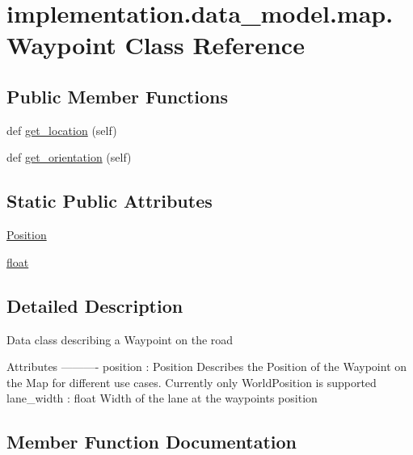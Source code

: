 \hypertarget{classimplementation_1_1data__model_1_1map_1_1_waypoint}{}\section{implementation.\+data\+\_\+model.\+map.\+Waypoint Class Reference}
\label{classimplementation_1_1data__model_1_1map_1_1_waypoint}
\subsection*{Public Member Functions}
\begin{DoxyCompactItemize}
\item 
def \hyperlink{classimplementation_1_1data__model_1_1map_1_1_waypoint_a32f92d4932a154b05aebf890c165dcf2}{get\+\_\+location} (self)
\item 
def \hyperlink{classimplementation_1_1data__model_1_1map_1_1_waypoint_a4bf35400c78d7673b1e10b3039d260e3}{get\+\_\+orientation} (self)
\end{DoxyCompactItemize}
\subsection*{Static Public Attributes}
\begin{DoxyCompactItemize}
\item 
\hyperlink{classimplementation_1_1data__model_1_1map_1_1_waypoint_ae8a2c70f60d08768b36f6d06ebfa34d2}{Position}
\item 
\hyperlink{classimplementation_1_1data__model_1_1map_1_1_waypoint_aeb94d09fe4b1cd5e76861a543eacfc85}{float}
\end{DoxyCompactItemize}


\subsection{Detailed Description}
\begin{DoxyVerb}Data class describing a Waypoint on the road

Attributes
----------
position : Position
    Describes the Position of the Waypoint on the Map for different use cases.
    Currently only WorldPosition is supported
lane_width : float
    Width of the lane at the waypoints position
\end{DoxyVerb}
 

\subsection{Member Function Documentation}
\mbox{\label{classimplementation_1_1data__model_1_1map_1_1_waypoint_a32f92d4932a154b05aebf890c165dcf2}} 
